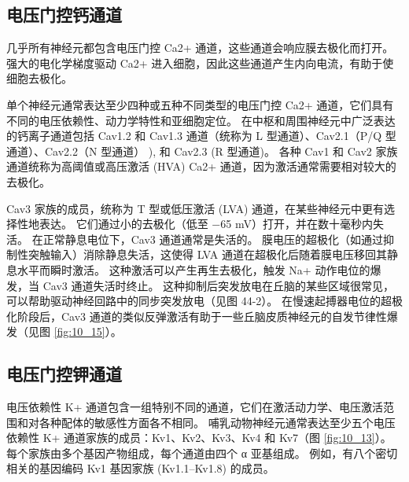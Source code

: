 \subsection{电压门控钙通道}

几乎所有神经元都包含电压门控 Ca2+ 通道，这些通道会响应膜去极化而打开。
强大的电化学梯度驱动 Ca2+ 进入细胞，因此这些通道产生内向电流，有助于使细胞去极化。


单个神经元通常表达至少四种或五种不同类型的电压门控 Ca2+ 通道，它们具有不同的电压依赖性、动力学特性和亚细胞定位。
在中枢和周围神经元中广泛表达的钙离子通道包括 Cav1.2 和 Cav1.3 通道（统称为 L 型通道）、Cav2.1（P/Q 型通道）、Cav2.2（N 型通道） ), 和 Cav2.3 (R 型通道)。
各种 Cav1 和 Cav2 家族通道统称为高阈值或高压激活 (HVA) Ca2+ 通道，因为激活通常需要相对较大的去极化。


Cav3 家族的成员，统称为 T 型或低压激活 (LVA) 通道，在某些神经元中更有选择性地表达。
它们通过小的去极化（低至 −65 mV）打开，并在数十毫秒内失活。
在正常静息电位下，Cav3 通道通常是失活的。
膜电压的超极化（如通过抑制性突触输入）消除静息失活，这使得 LVA 通道在超极化后随着膜电压移回其静息水平而瞬时激活。 
这种激活可以产生再生去极化，触发 Na+ 动作电位的爆发，当 Cav3 通道失活时终止。 
这种抑制后突发放电在丘脑的某些区域很常见，可以帮助驱动神经回路中的同步突发放电（见图 44-2）。 
在慢速起搏器电位的超极化阶段后，Cav3 通道的类似反弹激活有助于一些丘脑皮质神经元的自发节律性爆发（见图 \ref{fig:10_15}）。


\subsection{电压门控钾通道}
电压依赖性 K+ 通道包含一组特别不同的通道，它们在激活动力学、电压激活范围和对各种配体的敏感性方面各不相同。 
哺乳动物神经元通常表达至少五个电压依赖性 K+ 通道家族的成员：Kv1、Kv2、Kv3、Kv4 和 Kv7（图 \ref{fig:10_13}）。 
每个家族由多个基因产物组成，每个通道由四个 α 亚基组成。 
例如，有八个密切相关的基因编码 Kv1 基因家族 (Kv1.1–Kv1.8) 的成员。

